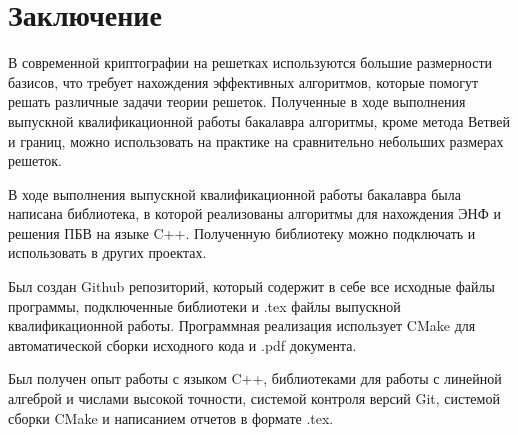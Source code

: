 \newpage

\section{Заключение}

В современной криптографии на решетках используются большие размерности базисов, что требует нахождения эффективных алгоритмов, которые помогут решать различные задачи теории решеток. Полученные в ходе выполнения выпускной квалификационной работы бакалавра алгоритмы, кроме метода Ветвей и границ, можно использовать на практике на сравнительно небольших размерах решеток.

В ходе выполнения выпускной квалификационной работы бакалавра была написана библиотека, в которой реализованы алгоритмы для нахождения ЭНФ и решения ПБВ на языке C++. Полученную библиотеку можно подключать и использовать в других проектах.

Был создан Github репозиторий, который содержит в себе все исходные файлы программы, подключенные библиотеки и .tex файлы выпускной квалификационной работы. Программная реализация использует CMake для автоматической сборки исходного кода и .pdf документа.

Был получен опыт работы с языком C++, библиотеками для работы с линейной алгеброй и числами высокой точности, системой контроля версий Git, системой сборки CMake и написанием отчетов в формате .tex.

\clearpage